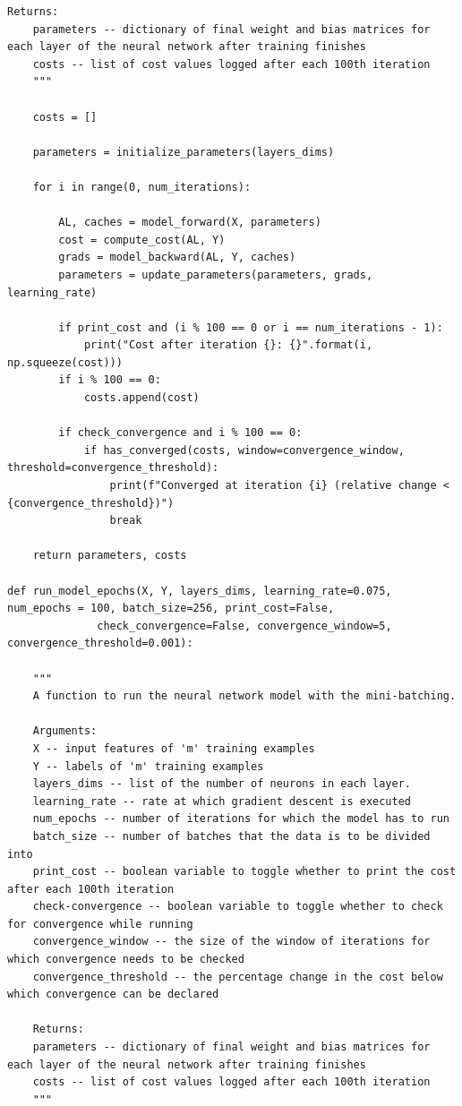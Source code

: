 \documentclass{article}
\begin{document}
\begin{lstlisting}[caption={Neural network functions - NN\_helper\_functions.py}]
    Returns:
    parameters -- dictionary of final weight and bias matrices for each layer of the neural network after training finishes
    costs -- list of cost values logged after each 100th iteration
    """

    costs = []

    parameters = initialize_parameters(layers_dims)

    for i in range(0, num_iterations):

        AL, caches = model_forward(X, parameters)
        cost = compute_cost(AL, Y)
        grads = model_backward(AL, Y, caches)
        parameters = update_parameters(parameters, grads, learning_rate)

        if print_cost and (i % 100 == 0 or i == num_iterations - 1):
            print("Cost after iteration {}: {}".format(i, np.squeeze(cost)))
        if i % 100 == 0:
            costs.append(cost)
        
        if check_convergence and i % 100 == 0:
            if has_converged(costs, window=convergence_window, threshold=convergence_threshold):
                print(f"Converged at iteration {i} (relative change < {convergence_threshold})")
                break
    
    return parameters, costs

def run_model_epochs(X, Y, layers_dims, learning_rate=0.075, num_epochs = 100, batch_size=256, print_cost=False,
              check_convergence=False, convergence_window=5, convergence_threshold=0.001):
    
    """
    A function to run the neural network model with the mini-batching.

    Arguments:
    X -- input features of 'm' training examples
    Y -- labels of 'm' training examples
    layers_dims -- list of the number of neurons in each layer.
    learning_rate -- rate at which gradient descent is executed
    num_epochs -- number of iterations for which the model has to run
    batch_size -- number of batches that the data is to be divided into
    print_cost -- boolean variable to toggle whether to print the cost after each 100th iteration
    check-convergence -- boolean variable to toggle whether to check for convergence while running
    convergence_window -- the size of the window of iterations for which convergence needs to be checked
    convergence_threshold -- the percentage change in the cost below which convergence can be declared

    Returns:
    parameters -- dictionary of final weight and bias matrices for each layer of the neural network after training finishes
    costs -- list of cost values logged after each 100th iteration
    """
    

\end{lstlisting}
\end{document}
